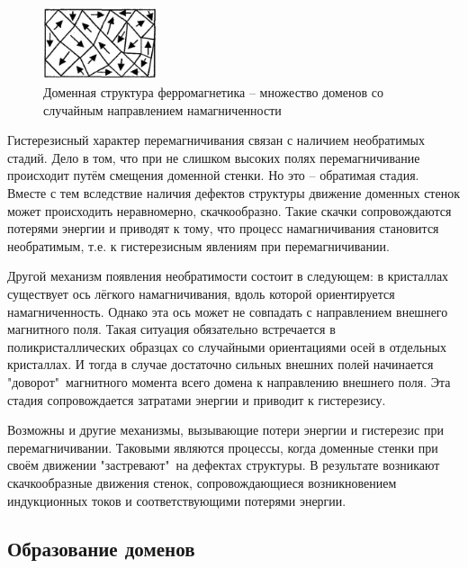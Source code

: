 \documentclass[a4paper,14pt]{article} %
\begin{document}
\begin{figure}[h!]

\begin{center}
\includegraphics[width=0.3\textwidth]{9.3.7.png} 
\end{center}
\caption{Доменная структура ферромагнетика -- множество  доменов со случайным направлением намагниченности}
\label{937}
\end{figure}

Гистерезисный характер перемагничивания связан с наличием необратимых стадий. Дело в том, что при не слишком высоких полях перемагничивание происходит путём смещения доменной стенки. Но это -- обратимая стадия. Вместе с тем вследствие наличия дефектов структуры движение доменных стенок может происходить неравномерно, скачкообразно. Такие скачки сопровождаются потерями энергии и приводят к тому, что процесс намагничивания становится необратимым, т.е. к гистерезисным явлениям при перемагничивании.

Другой механизм появления необратимости состоит в следующем: в кристаллах существует $\textbf{ось лёгкого намагничивания}$, вдоль которой ориентируется намагниченность. Однако эта ось может не совпадать с направлением внешнего магнитного поля. Такая ситуация обязательно встречается в $\textbf{поликристаллических образцах}$ со случайными ориентациями осей в отдельных кристаллах. И тогда в случае достаточно сильных внешних полей начинается "доворот"\ магнитного момента всего домена к направлению внешнего поля. Эта стадия сопровождается затратами энергии и приводит к гистерезису.

Возможны и другие механизмы, вызывающие потери энергии и гистерезис при перемагничивании. Таковыми являются процессы, когда доменные стенки при своём движении "застревают"\ на дефектах структуры. В результате возникают скачкообразные движения стенок, сопровождающиеся возникновением индукционных токов и соответствующими потерями энергии.

\subsection{Образование доменов}
\end{document}
